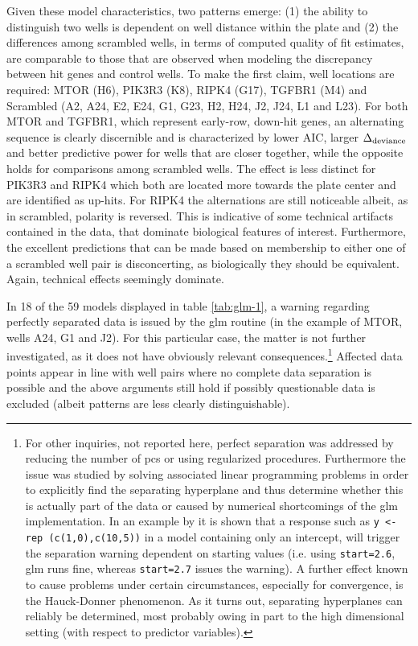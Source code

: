 Given these model characteristics, two patterns emerge: (1) the ability to distinguish two wells is dependent on well distance within the plate and (2) the differences among scrambled wells, in terms of computed quality of fit estimates, are comparable to those that are observed when modeling the discrepancy between hit genes and control wells. To make the first claim, well locations are required: MTOR (H6), PIK3R3 (K8), RIPK4 (G17), TGFBR1 (M4) and Scrambled (A2, A24, E2, E24, G1, G23, H2, H24, J2, J24, L1 and L23). For both MTOR and TGFBR1, which represent early-row, down-hit genes, an alternating sequence is clearly discernible and is characterized by lower AIC, larger $\Delta\textsubscript{deviance}$ and better predictive power for wells that are closer together, while the opposite holds for comparisons among scrambled wells. The effect is less distinct for PIK3R3 and RIPK4 which both are located more towards the plate center and are identified as up-hits. For RIPK4 the alternations are still noticeable albeit, as in scrambled, polarity is reversed. This is indicative of some technical artifacts contained in the data, that dominate biological features of interest. Furthermore, the excellent predictions that can be made based on membership to either one of a scrambled well pair is disconcerting, as biologically they should be equivalent. Again, technical effects seemingly dominate.

In 18 of the 59 models displayed in table \ref{tab:glm-1}, a warning regarding perfectly separated data is issued by the glm routine (in the example of MTOR, wells A24, G1 and J2). For this particular case, the matter is not further investigated, as it does not have obviously relevant consequences.\footnote{For other inquiries, not reported here, perfect separation was addressed by reducing the number of \glspl{pc} or using regularized procedures. Furthermore the issue was studied by solving associated linear programming problems in order to explicitly find the separating hyperplane and thus determine whether this is actually part of the data or caused by numerical shortcomings of the glm implementation. In an example by \citeauthor{Gelman2007} it is shown that a response such as \texttt{y <- rep (c(1,0),c(10,5))} in a model containing only an intercept, will trigger the separation warning dependent on starting values (i.e. using \texttt{start=2.6}, glm runs fine, whereas \texttt{start=2.7} issues the warning). A further effect known to cause problems under certain circumstances, especially for convergence, is the Hauck-Donner phenomenon. As it turns out, separating hyperplanes can reliably be determined, most probably owing in part to the high dimensional setting (with respect to predictor variables).} Affected data points appear in line with well pairs where no complete data separation is possible and the above arguments still hold if possibly questionable data is excluded (albeit patterns are less clearly distinguishable).

